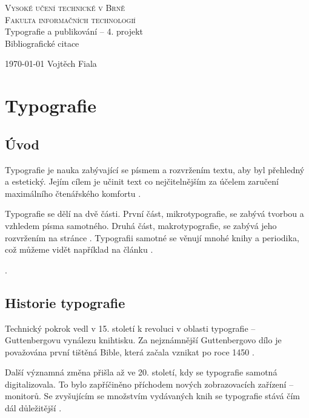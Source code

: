 \documentclass[a4paper, 11pt]{article}
\begin{document}
	\begin{titlepage}
		\begin{center}
			{\Huge\textsc{
				Vysoké učení technické v Brně\\[0.3em]}}
				{\huge\textsc{Fakulta informačních technologií
			}}
			\\
			{\LARGE
				 Typografie a publikování -- 4. projekt\\[0.3em]}
				 {\Huge{Bibliografické citace}}
		\end{center}
		{\Large
		    \today
			\hfill
			Vojtěch Fiala
		}
	\end{titlepage}

\section{Typografie}
\subsection{Úvod}
Typografie je nauka zabývající se písmem a rozvržením textu, aby byl přehledný a estetický. Jejím cílem je učinit text co nejčitelnějším za účelem zaručení maximálního čtenářského komfortu \cite{Maria2016}. 

Typografie se dělí na dvě části. První část, mikrotypografie, se zabývá tvorbou a vzhledem písma samotného. Druhá část, makrotypografie, se zabývá jeho rozvržením na stránce \cite{Wiki2019}. Typografii samotné se věnují mnohé knihy a periodika, což můžeme vidět například na článku \cite{Stejskalova2006}.

 \cite{Bringhurst1992}.


\subsection{Historie typografie}
Technický pokrok vedl v 15. století k revoluci v oblasti typografie -- Guttenbergovu vynálezu knihtisku. Za nejznámnější Guttenbergovo dílo je považována první tištěná Bible, která začala vznikat po roce 1450 \cite{Uhlirova2016}.

Další významná změna přišla až ve 20. století, kdy se typografie samotná digitalizovala. To bylo zapříčiněno příchodem nových zobrazovacích zařízení -- monitorů. Se zvyšujícím se množstvím vydávaných knih se typografie stává čím dál důležitější \cite{Jirasek2015}.
\end{document}
